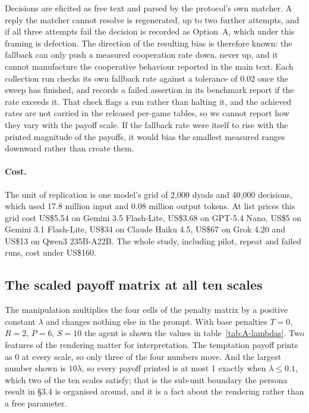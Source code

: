 \documentclass[11pt,a4paper]{article}
\newcommand{\lam}{\lambda}
\newcommand{\rev}[1]{{\color{red}#1}}
\newcommand{\rev}[1]{#1}
\begin{document}
Decisions are elicited as free text and parsed by the protocol's own matcher. A reply the matcher cannot resolve is regenerated, up to two further attempts, and if all three attempts fail the decision is recorded as Option~A, which under this framing is defection. The direction of the resulting bias is therefore known: the fallback can only push a measured cooperation rate down, never up, and it cannot manufacture the cooperative behaviour reported in the main text. Each collection run checks its own fallback rate against a tolerance of 0.02 once the sweep has finished, and records a failed assertion in its benchmark report if the rate exceeds it. That check flags a run rather than halting it, and the achieved rates are not carried in the released per-game tables, so we cannot report how they vary with the payoff scale. If the fallback rate were itself to rise with the printed magnitude of the payoffs, it would bias the smallest measured ranges downward rather than create them.

\rev{\paragraph{Cost.} The unit of replication is one model's grid of 2{,}000 dyads and 40{,}000 decisions, which used 17.8 million input and 0.08 million output tokens. At list prices this grid cost US\$5.54 on Gemini 3.5 Flash-Lite, US\$3.68 on GPT-5.4 Nano, US\$5 on Gemini 3.1 Flash-Lite,  US\$34 on Claude Haiku 4.5, US\$67 on Grok 4.20 and US\$13 on Qwen3 235B-A22B. The whole study, including pilot, repeat and failed runs, cost under US\$160.}

\subsection{The scaled payoff matrix at all ten scales}\label{appendix:payoff_scaling}

The manipulation multiplies the four cells of the penalty matrix by a positive constant $\lam$ and changes nothing else in the prompt. With base penalties $T = 0$, $R = 2$, $P = 6$, $S = 10$ the agent is shown the values in table~\ref{tab:A-lambdas}. Two features of the rendering matter for interpretation. The temptation payoff prints as 0 at every scale, so only three of the four numbers move. And the largest number shown is $10\lam$, so every payoff printed is at most 1 exactly when $\lam \leq 0.1$, which two of the ten scales satisfy; that is the sub-unit boundary the persona result in \S3.4 is organised around, and it is a fact about the rendering rather than a free parameter.
\end{document}
